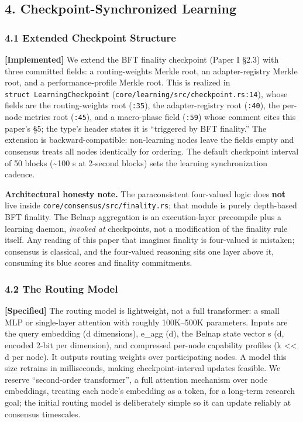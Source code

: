 \subsection{4. Checkpoint-Synchronized
Learning}\label{checkpoint-synchronized-learning}

\subsubsection{4.1 Extended Checkpoint
Structure}\label{extended-checkpoint-structure}

\textbf{{[}Implemented{]}} We extend the BFT finality checkpoint (Paper
I §2.3) with three committed fields: a routing-weights Merkle root, an
adapter-registry Merkle root, and a performance-profile Merkle root.
This is realized in \texttt{struct\ LearningCheckpoint}
(\texttt{core/learning/src/checkpoint.rs:14}), whose fields are the
routing-weights root (\texttt{:35}), the adapter-registry root
(\texttt{:40}), the per-node metrics root (\texttt{:45}), and a
macro-phase field (\texttt{:59}) whose comment cites this paper's §5;
the type's header states it is ``triggered by BFT finality.'' The
extension is backward-compatible: non-learning nodes leave the fields
empty and consensus treats all nodes identically for ordering. The
default checkpoint interval of 50 blocks (\textasciitilde100 s at
2-second blocks) sets the learning synchronization cadence.

\textbf{Architectural honesty note.} The paraconsistent four-valued
logic does \textbf{not} live inside
\texttt{core/consensus/src/finality.rs}; that module is purely
depth-based BFT finality. The Belnap aggregation is an execution-layer
precompile plus a learning daemon, \emph{invoked at} checkpoints, not a
modification of the finality rule itself. Any reading of this paper that
imagines finality is four-valued is mistaken; consensus is classical,
and the four-valued reasoning sits one layer above it, consuming its
blue scores and finality commitments.

\subsubsection{4.2 The Routing Model}\label{the-routing-model}

\textbf{{[}Specified{]}} The routing model is lightweight, not a full
transformer: a small MLP or single-layer attention with roughly
100K--500K parameters. Inputs are the query embedding (d dimensions),
e\_agg (d), the Belnap state vector s (d, encoded 2-bit per dimension),
and compressed per-node capability profiles (k \textless\textless{} d
per node). It outputs routing weights over participating nodes. A model
this size retrains in milliseconds, making checkpoint-interval updates
feasible. We reserve ``second-order transformer'', a full attention
mechanism over node embeddings, treating each node's embedding as a
token, for a long-term research goal; the initial routing model is
deliberately simple so it can update reliably at consensus timescales.

